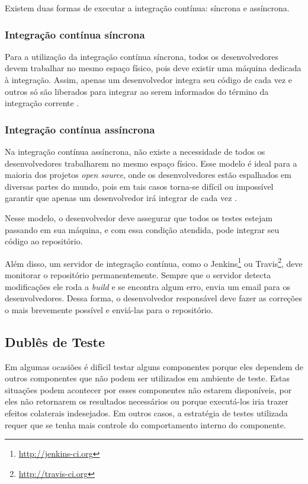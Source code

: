 Existem duas formas de executar a integração contínua: síncrona e assíncrona.

\subsubsection{Integração contínua síncrona}
\label{ssub:integracao_continua_sincrona}

Para a utilização da integração contínua síncrona, todos os desenvolvedores devem trabalhar no mesmo espaço físico, pois deve existir uma máquina dedicada à integração. Assim, apenas um desenvolvedor integra seu código de cada vez e outros só são liberados para integrar ao serem informados do término da integração corrente \cite{ImproveitCI}.



\subsubsection{Integração contínua assíncrona}
\label{ssub:integracao_continua_assincrona}

Na integração contínua assíncrona, não existe a necessidade de todos os desenvolvedores trabalharem no mesmo espaço físico. Esse modelo é ideal para a maioria dos projetos \textit{open source}, onde os desenvolvedores estão espalhados em diversas partes do mundo, pois em tais casos torna-se difícil ou impossível garantir que apenas um desenvolvedor irá integrar de cada vez \cite{ImproveitCI}.

Nesse modelo, o desenvolvedor deve assegurar que todos os testes estejam passando em sua máquina, e com essa condição atendida, pode integrar seu código ao repositório.

Além disso, um servidor de integração contínua, como o Jenkins\footnote{\url{http://jenkins-ci.org}} ou Travis\footnote{\url{http://travis-ci.org}}, deve monitorar o repositório permanentemente. Sempre que o servidor detecta modificações ele roda a \textit{build} e se encontra algum erro, envia um email para os desenvolvedores. Dessa forma, o desenvolvedor responsável deve fazer as correções o mais brevemente possível e enviá-las para o repositório.


\subsection{Dublês de Teste}
\label{sub:dubles_de_teste}

Em algumas ocasiões é difícil testar alguns componentes porque eles dependem de outros componentes que não podem ser utilizados em ambiente de teste. Estas situações podem acontecer por esses componentes não estarem disponíveis, por eles não retornarem os resultados necessários ou porque executá-los iria trazer efeitos colaterais indesejados. Em outros casos, a estratégia de testes utilizada requer que se tenha mais controle do comportamento interno do componente.

